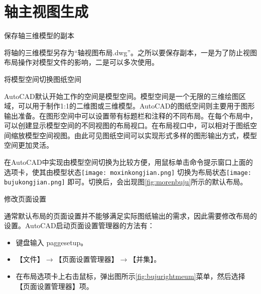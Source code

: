 \section{轴主视图生成}\label{sec:zhoushitu}
\begin{procedure}
\item 保存轴三维模型的副本

将轴的三维模型另存为“轴视图布局.dwg”。之所以要保存副本，一是为了防止视图布局操作对模型文件的影响，二是可以多次使用。


\item 将模型空间切换图纸空间

AutoCAD默认开始工作的空间是模型空间。模型空间是一个无限的三维绘图区域，可以用于制作1:1的二维图或三维模型。AutoCAD的图纸空间则主要用于图形输出准备。在图形空间中可以设置带有标题栏和注释的不同布局。在每个布局中，可以创建显示模型空间的不同视图的布局视口。在布局视口中，可以相对于图纸空间缩放模型空间视图。由此可见图纸空间可以实现形式多样的图形输出方式，模型空间更加灵活。

在AutoCAD中实现由模型空间切换为比较方便，用鼠标单击命令提示窗口上面的选项卡，使其由模型状态\texttt{[image: moxinkongjian.png]} 切换为布局状态\texttt{[image: bujukongjian.png]} 即可。切换后，会出现图\ref{fig:morenbuju}所示的默认布局。

\begin{figure}[htbp]
\centering
\begin{floatrow}[2]
\end{floatrow}
\end{figure}

\item 修改页面设置

通常默认布局的页面设置并不能够满足实际图纸输出的需求，因此需要修改布局的设置。AutoCAD启动页面设置管理器的方法有：
\begin{itemize}
\item 键盘输入 paggesetup。
\item 【文件】$\rightarrow$【页面设置管理器】$\rightarrow$【并集】。
\item 在布局选项卡上右击鼠标，弹出图所示\ref{fig:bujurightmeum}菜单，然后选择【页面设置管理器】项。
\end{itemize}


\end{procedure}
